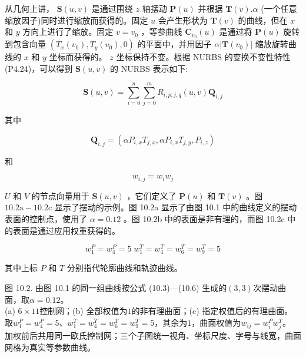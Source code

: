 \documentclass[../main.tex]{subfiles}
\begin{document}
从几何上讲， \(\mathbf{S}\left( {u,v}\right)\) 是通过围绕 \(z\) 轴摆动 \(\mathbf{P}\left( u\right)\) 并根据 \(\mathbf{T}\left( v\right) .\alpha\) (一个任意缩放因子)同时进行缩放而获得的。固定 \(u\) 会产生形状为 \(\mathbf{T}\left( v\right)\) 的曲线，但在 \(x\) 和 \(y\) 方向上进行了缩放。固定 \(v = {v}_{0}\) ，等参曲线 \({\mathbf{C}}_{{v}_{0}}\left( u\right)\) 是通过将 \(\mathbf{P}\left( u\right)\) 旋转到包含向量 \(\left( {{T}_{x}\left( {v}_{0}\right) ,{T}_{y}\left( {v}_{0}\right) ,0}\right)\) 的平面中，并用因子 \(\alpha \left| {\mathbf{T}\left( {v}_{0}\right) }\right|\) 缩放旋转曲线的 \(x\) 和 \(y\) 坐标而获得的。 \(z\) 坐标保持不变。根据 NURBS 的变换不变性特性(P4.24)，可以得到 \(\mathbf{S}\left( {u,v}\right)\) 的 NURBS 表示如下:

\[
\mathbf{S}\left( {u,v}\right)  = \mathop{\sum }\limits_{{i = 0}}^{n}\mathop{\sum }\limits_{{j = 0}}^{m}{R}_{i,p;j,q}\left( {u,v}\right) {\mathbf{Q}}_{i,j} \tag{10.4}
\]

其中

\[
{\mathbf{Q}}_{i,j} = \left( {\alpha {P}_{i,x}{T}_{j,x},\alpha {P}_{i,x}{T}_{j,y},{P}_{i,z}}\right)  \tag{10.5}
\]

和

\[
{w}_{i,j} = {w}_{i}{w}_{j} \tag{10.6}
\]

\(U\) 和 \(V\) 的节点向量用于 \(\mathbf{S}\left( {u,v}\right)\) ，它们定义了 \(\mathbf{P}\left( u\right)\) 和 \(\mathbf{T}\left( v\right)\) 。图 \({10.2}\mathrm{a} - {10.2}\mathrm{c}\) 显示了摆动的示例。图 10.2a 显示了由图 10.1 中的曲线定义的摆动表面的控制点，使用了 \(\alpha  = {0.12}\) 。图 10.2b 中的表面是非有理的，而图 10.2c 中的表面是通过应用权重获得的。

\[
{w}_{1}^{P} = {w}_{4}^{P} = 5\;{w}_{1}^{T} = {w}_{4}^{T} = {w}_{6}^{T} = {w}_{9}^{T} = 5
\]

其中上标 \(P\) 和 \(T\) 分别指代轮廓曲线和轨迹曲线。



\begin{center}
\begin{minipage}{35cm}
\vspace*{.6\baselineskip}
\centering
{}\hspace{.7cm}
\par\smallskip
图 10.2. 由图 10.1 的同一组曲线按公式 (10.3)—(10.6) 生成的$(3,3)$次摆动曲面，取$\alpha=0.12$。\\
(a) $6\times11$控制网；(b) 全部权值为$1$的非有理曲面；(c) 指定权值后的有理曲面。\\
取$w_1^P=w_4^P=5$、$w_1^T=w_4^T=w_6^T=w_9^T=5$，其余为$1$，曲面权值为$w_{ij}=w_i^P w_j^T$。\\
加权前后共用同一欧氏控制网；三个子图统一视角、坐标尺度、字号与线宽，曲面网格为真实等参数曲线。
\end{minipage}
\end{center}
\end{document}
